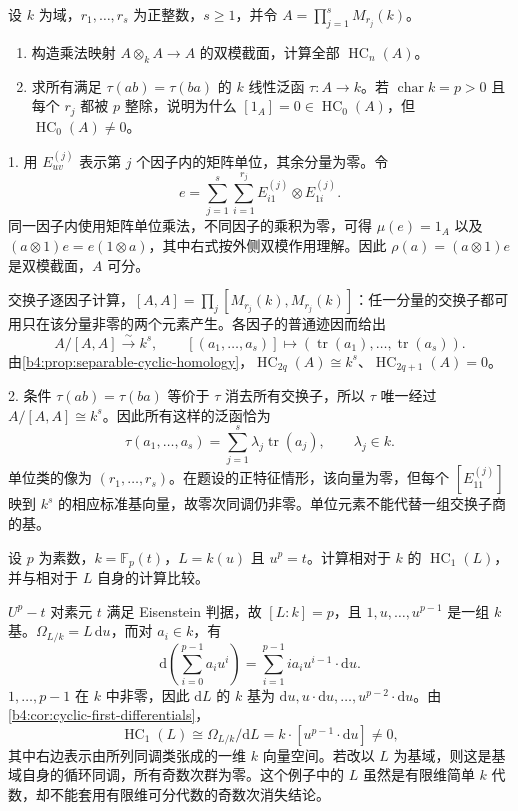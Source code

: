 \begin{optionalexercise}\label{b4:ex:cyclic-product-matrices}
	设 \(k\) 为域，\(r_1,\ldots,r_s\) 为正整数，\(s\ge1\)，并令 \(A=\prod_{j=1}^sM_{r_j}(k)\)。
	\begin{enumerate}
		\item 构造乘法映射 \(A\otimes_kA\to A\) 的双模截面，计算全部 \(\operatorname{HC}_n(A)\)。
		\item 求所有满足 \(\tau(ab)=\tau(ba)\) 的 \(k\) 线性泛函 \(\tau:A\to k\)。若 \(\operatorname{char}k=p>0\) 且每个 \(r_j\) 都被 \(p\) 整除，说明为什么 \([1_A]=0\in\operatorname{HC}_0(A)\)，但 \(\operatorname{HC}_0(A)\ne0\)。
	\end{enumerate}
\end{optionalexercise}
\begin{solution}
	1. 用 \(E_{uv}^{(j)}\) 表示第 \(j\) 个因子内的矩阵单位，其余分量为零。令
	\[
		e=\sum_{j=1}^s\sum_{i=1}^{r_j}E_{i1}^{(j)}\otimes E_{1i}^{(j)}.
	\]
	同一因子内使用矩阵单位乘法，不同因子的乘积为零，可得 \(\mu(e)=1_A\) 以及 \((a\otimes1)e=e(1\otimes a)\)，其中右式按外侧双模作用理解。因此 \(\rho(a)=(a\otimes1)e\) 是双模截面，\(A\) 可分。

	交换子逐因子计算，\([A,A]=\prod_j[M_{r_j}(k),M_{r_j}(k)]\)：任一分量的交换子都可用只在该分量非零的两个元素产生。各因子的普通迹因而给出
	\[
		A/[A,A]\xrightarrow{\sim}k^s,\qquad
		[(a_1,\ldots,a_s)]\longmapsto(\operatorname{tr}(a_1),\ldots,\operatorname{tr}(a_s)).
	\]
	由\cref{b4:prop:separable-cyclic-homology}，\(\operatorname{HC}_{2q}(A)\cong k^s\)、\(\operatorname{HC}_{2q+1}(A)=0\)。

	2. 条件 \(\tau(ab)=\tau(ba)\) 等价于 \(\tau\) 消去所有交换子，所以 \(\tau\) 唯一经过 \(A/[A,A]\cong k^s\)。因此所有这样的泛函恰为
	\[
		\tau(a_1,\ldots,a_s)=\sum_{j=1}^s\lambda_j\operatorname{tr}(a_j),\qquad\lambda_j\in k.
	\]
	单位类的像为 \((r_1,\ldots,r_s)\)。在题设的正特征情形，该向量为零，但每个 \([E_{11}^{(j)}]\) 映到 \(k^s\) 的相应标准基向量，故零次同调仍非零。单位元素不能代替一组交换子商的基。
\end{solution}

\begin{optionalexercise}\label{b4:ex:cyclic-inseparable-field}
	设 \(p\) 为素数，\(k=\mathbb F_p(t)\)，\(L=k(u)\) 且 \(u^p=t\)。计算相对于 \(k\) 的 \(\operatorname{HC}_1(L)\)，并与相对于 \(L\) 自身的计算比较。
\end{optionalexercise}
\begin{solution}
	\(U^p-t\) 对素元 \(t\) 满足 Eisenstein 判据，故 \([L:k]=p\)，且 \(1,u,\ldots,u^{p-1}\) 是一组 \(k\) 基。\(\Omega_{L/k}=L\,\mathrm d u\)，而对 \(a_i\in k\)，有
	\[
		\mathrm d\!\left(\sum_{i=0}^{p-1}a_i u^i\right)
		=\sum_{i=1}^{p-1}i a_i u^{i-1}\cdot\mathrm d u.
	\]
	\(1,\ldots,p-1\) 在 \(k\) 中非零，因此 \(\mathrm dL\) 的 \(k\) 基为 \(\mathrm d u,u\cdot\mathrm d u,\ldots,u^{p-2}\cdot\mathrm d u\)。由\cref{b4:cor:cyclic-first-differentials}，
	\[
		\operatorname{HC}_1(L)\cong\Omega_{L/k}/\mathrm dL
		=k\cdot[u^{p-1}\cdot\mathrm d u]\ne0,
	\]
	其中右边表示由所列同调类张成的一维 \(k\) 向量空间。若改以 \(L\) 为基域，则这是基域自身的循环同调，所有奇数次群为零。这个例子中的 \(L\) 虽然是有限维简单 \(k\) 代数，却不能套用有限维可分代数的奇数次消失结论。
\end{solution}

